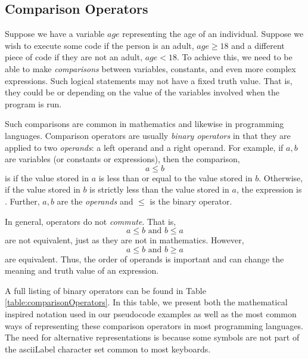 \subsection{Comparison Operators}

Suppose we have a variable $age$ representing the age of an individual.  Suppose
we wish to execute some code if the person is an adult, $age \geq 18$ and a different
piece of code if they are not an adult, $age < 18$.  To achieve this, we need to be
able to make \emph{comparisons} between variables, constants, and even more 
complex expressions.  Such logical statements may not have a fixed truth value.  That
is, they could be \True or \False depending on the value of the variables involved 
when the program is run.  

Such comparisons are common in mathematics and likewise in programming languages.
Comparison operators are usually \emph{binary operators} in that they are applied
to two \emph{operands}: a left operand and a right operand.  For example, if $a, b$
are variables (or constants or expressions), then the comparison, 
  $$a \leq b$$
is \True if the value stored in $a$ is less than or equal to the value stored in $b$.  Otherwise, 
if the value stored in $b$ is strictly less than the value stored in $a$, the expression is
\False.  Further, $a, b$ are the \emph{operands} and $\leq$ is the binary operator.

In general, operators do not \emph{commute}.  That is, 
  $$a \leq b \textrm{ and } b \leq a$$
are not equivalent, just as they are not in mathematics.  However, 
  $$a \leq b \textrm{ and } b \geq a$$
are equivalent.  Thus, the order of operands is important and can change the 
meaning and truth value of an expression.

A full listing of binary operators can be found in Table \ref{table:comparisonOperators}.
In this table, we present both the mathematical inspired notation used in our pseudocode
examples as well as the most common ways of representing these comparison
operators in most programming languages.  The need for alternative representations
is because some symbols are not part of the \gls{asciiLabel} character set common
to most keyboards.  

